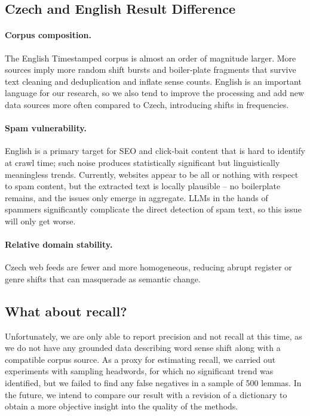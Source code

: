 \documentclass[11pt]{article}
\begin{document}
\subsection{Czech and English Result Difference}
\paragraph{Corpus composition.}
  The English Timestamped corpus is almost an order of magnitude larger.
  More sources imply more random shift bursts and boiler‑plate fragments that
  survive text cleaning and deduplication and inflate sense counts. English is an important language for our research, so we also tend to improve the processing and add new data sources more often compared to Czech, introducing shifts in frequencies.
\paragraph{Spam vulnerability.}  
  English is a primary target for SEO and click‑bait content that is hard
  to identify at crawl time; such noise produces statistically significant
  but linguistically meaningless trends.  Currently, websites appear to be all or nothing with respect to spam content, but the extracted text is locally plausible -- no boilerplate remains, and the issues only emerge in aggregate. LLMs in the hands of spammers significantly complicate the direct detection of spam text, so this issue will only get worse.
\paragraph{Relative domain stability.}
  Czech web feeds are fewer and more homogeneous, reducing abrupt
  register or genre shifts that can masquerade as semantic change.

\subsection{What about recall?}
Unfortunately, we are only able to report precision and not recall at this time, as we do not have any grounded data describing word sense shift along with a compatible corpus source.
As a proxy for estimating recall, we carried out experiments with sampling headwords, for which no significant trend was identified, but we failed to find any false negatives in a sample of 500 lemmas.
In the future, we intend to compare our result with a revision of a dictionary to obtain a more objective insight into the quality of the methods.
\end{document}
